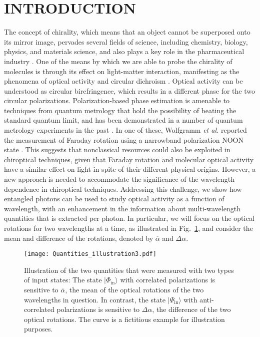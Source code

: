 \documentclass[12pt,preprint]{revtex4}
\begin{document}
\maketitle       

\section*{INTRODUCTION}
The concept of chirality, which means that an object cannot be superposed onto its mirror image, pervades several fields of science, including chemistry, biology, physics, and materials science, and also plays a key role in the pharmaceutical industry \citep{Lough2002,Amabilino2009}.
One of the means by which we are able to probe the chirality of molecules is through its effect on light-matter interaction, manifesting as the phenomena of optical activity and circular dichroism \citep{Caldwell1971,Charney1979,Barron2004}.
Optical activity can be understood as circular birefringence, which results in a different phase for the two circular polarizations. 
Polarization-based phase estimation is amenable to techniques from quantum metrology that hold the possibility of beating the standard quantum limit, and has been demonstrated in a number of quantum metrology experiments in the past \citep{Kuzmich1999,Mitchell.2004,Sun2008,Higgins2009,Xiang2010,Afek2010,Wolfgramm2012,Xiang2013,Israel2014,Ono2013}. In one of these, Wolfgramm \emph{et al.} reported the measurement of Faraday rotation using a narrowband polarization NOON state  \citep{Wolfgramm2012}. This suggests that nonclassical resources could also be exploited in chiroptical techniques, given that Faraday rotation and molecular optical activity have a similar effect on light in spite of their different physical origins. However, a new approach is needed to accommodate the significance of the wavelength dependence in chiroptical techniques.
Addressing this challenge, we show how entangled photons can be used to study optical activity as a function of wavelength, with an enhancement in the information about multi-wavelength quantities that is extracted per photon. In particular, we will focus on the optical rotations for two wavelengths at a time, as illustrated in Fig.\ \ref{fig:Quantities_illustration}, and consider the mean and difference of the rotations, denoted by $\overline{\alpha}$  and $\Delta \alpha$. 

\begin{figure}[ht]
	\centering
		\texttt{[image: Quantities\_illustration3.pdf]}
	\caption{Illustration of the two quantities that were measured with two types of input states: The state $|\Phi_{\mathrm{in}}\rangle$ with correlated polarizations is sensitive to $\overline{\alpha}$, the mean of the optical rotations of the two wavelengths in question. In contrast, the state $|\Psi_{\mathrm{in}}\rangle$ with anti-correlated polarizations is sensitive to $\Delta \alpha$, the difference of the two optical rotations. The curve is a fictitious example for illustration purposes.}
	\label{fig:Quantities_illustration}
\end{figure} 
\end{document}
